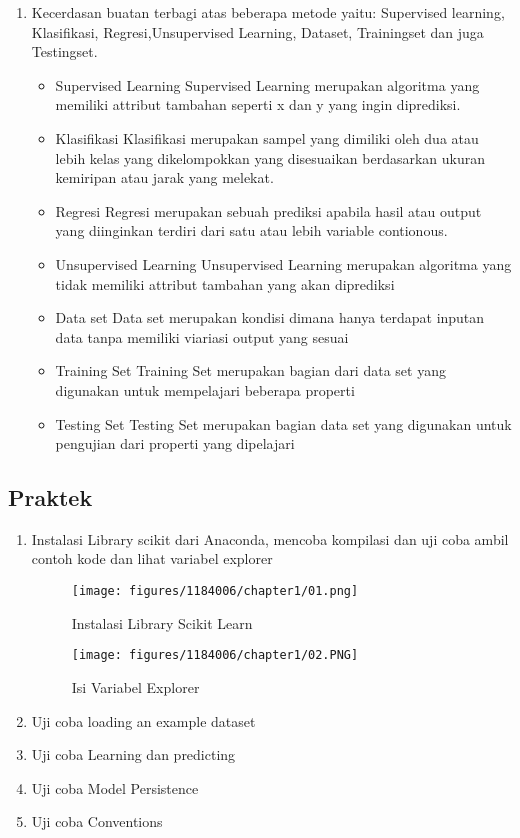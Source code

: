 \begin{enumerate}
	\item Kecerdasan buatan terbagi atas beberapa metode yaitu:
	\hfill\break
	Supervised learning,  Klasifikasi, Regresi,Unsupervised Learning, Dataset, Trainingset dan juga Testingset.
	\begin{itemize}
		\item Supervised Learning
		\hfill\break
	Supervised Learning	merupakan algoritma yang memiliki attribut tambahan seperti x dan y yang ingin diprediksi.
		\item Klasifikasi
		\hfill\break
		Klasifikasi merupakan sampel yang dimiliki oleh dua atau lebih kelas yang dikelompokkan yang disesuaikan berdasarkan ukuran kemiripan atau jarak yang melekat. 
		\item Regresi
		\hfill\break
Regresi	merupakan sebuah prediksi apabila hasil atau output yang diinginkan terdiri dari satu atau lebih variable contionous.
		\item Unsupervised Learning 
		\hfill\break
Unsupervised Learning  merupakan	algoritma yang tidak memiliki attribut tambahan yang akan diprediksi
		\item Data set
		\hfill\break
Data set	merupakan kondisi dimana hanya terdapat inputan data tanpa memiliki viariasi output yang sesuai
		\item Training Set
		\hfill\break
	Training Set	merupakan bagian dari data set yang digunakan untuk mempelajari beberapa properti		
		\item Testing Set
		\hfill\break
Testing Set	merupakan bagian data set yang digunakan untuk pengujian dari properti yang dipelajari
	\end{itemize}
\end{enumerate}
\subsection{Praktek}
\begin{enumerate}
	\item Instalasi Library scikit dari Anaconda, mencoba kompilasi dan uji coba ambil contoh kode dan lihat variabel explorer
	\hfill\break
	\begin{figure}[h]
		\texttt{[image: figures/1184006/chapter1/01.png]}
		\centering
		\caption{Instalasi Library Scikit Learn}
	\end{figure}
	\begin{figure}[h]
		\texttt{[image: figures/1184006/chapter1/02.PNG]}
		\centering
		\caption{Isi Variabel Explorer}
	\end{figure}
	\newpage\item Uji coba loading an example dataset
	\hfill\break

\item Uji coba Learning dan predicting
	\hfill\break
	
\item Uji coba Model Persistence
	\hfill\break
	
	\item Uji coba Conventions
	\hfill\break
	
	\end{enumerate}
